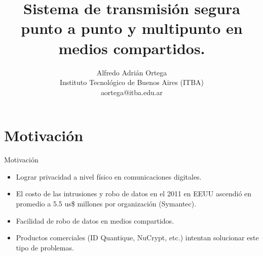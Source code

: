 \documentclass[aspectratio=169]{beamer}
\begin{document}
\title{\textbf{Sistema de transmisión segura punto a punto y multipunto en medios compartidos.}}


\author{\small Alfredo Adrián Ortega\\
Instituto Tecnológico de Buenos Aires (ITBA) \\
     aortega@itba.edu.ar\\    }








\section{Motivación}

\begin{frame}{Motivación}

\begin{itemize}
 \item Lograr privacidad a nivel físico en comunicaciones digitales.
 \item El costo de las intrusiones y robo de datos en el 2011 en EEUU ascendió en promedio a 5.5 us\$ millones por organización (Symantec).
 \item Facilidad de robo de datos en medios compartidos.
 \item Productos comerciales (ID Quantique, NuCrypt, etc.) intentan solucionar este tipo de problemas. 
 \end{itemize}

  

\end{frame}
\end{document}

